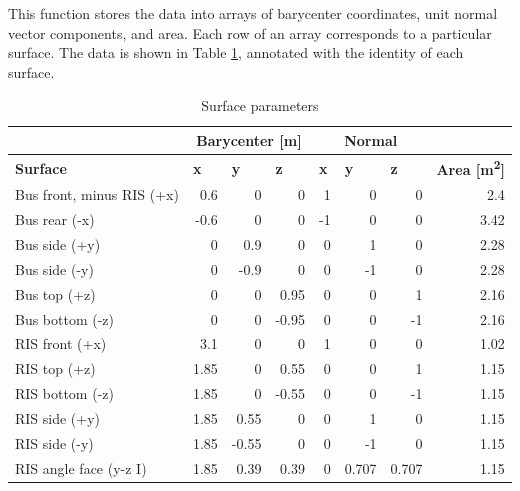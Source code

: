 

This function stores the data into arrays of barycenter coordinates, unit normal vector components, and area. Each row of an array corresponds to a particular surface. The data is shown in Table \ref{tab:surfaces}, annotated with the identity of each surface.

\begin{longtable}{lrrrrrrr}
\caption{Surface parameters}
\label{tab:surfaces}\\
 &
  \multicolumn{3}{c}{\textbf{Barycenter [m]}} &
  \multicolumn{3}{c}{\textbf{Normal}} &
  \multicolumn{1}{l}{} \\
\endfirsthead
%
\endhead
%
\textbf{Surface} &
  \multicolumn{1}{l}{\textbf{x}} &
  \multicolumn{1}{l}{\textbf{y}} &
  \multicolumn{1}{l}{\textbf{z}} &
  \multicolumn{1}{l}{\textbf{x}} &
  \multicolumn{1}{l}{\textbf{y}} &
  \multicolumn{1}{l}{\textbf{z}} &
  \multicolumn{1}{l}{\textbf{Area [m\textsuperscript{2}]}} \\
Bus front, minus RIS (+x) & 0.6   & 0     & 0     & 1      & 0      & 0      & 2.4   \\
Bus rear (-x)                  & -0.6  & 0     & 0     & -1     & 0      & 0      & 3.42  \\
Bus side (+y)                  & 0     & 0.9   & 0     & 0      & 1      & 0      & 2.28  \\
Bus side (-y)                  & 0     & -0.9  & 0     & 0      & -1     & 0      & 2.28  \\
Bus top (+z)                   & 0     & 0     & 0.95  & 0      & 0      & 1      & 2.16  \\
Bus bottom (-z)                & 0     & 0     & -0.95 & 0      & 0      & -1     & 2.16  \\
RIS front (+x)                 & 3.1   & 0     & 0     & 1      & 0      & 0      & 1.02  \\
RIS top (+z)                   & 1.85  & 0     & 0.55  & 0      & 0      & 1      & 1.15  \\
RIS bottom (-z)                & 1.85  & 0     & -0.55 & 0      & 0      & -1     & 1.15  \\
RIS side (+y)                  & 1.85  & 0.55  & 0     & 0      & 1      & 0      & 1.15  \\
RIS side (-y)                  & 1.85  & -0.55 & 0     & 0      & -1     & 0      & 1.15  \\
RIS angle face (y-z I)         & 1.85  & 0.39  & 0.39  & 0      & 0.707  & 0.707  & 1.15  \\

\end{longtable}
